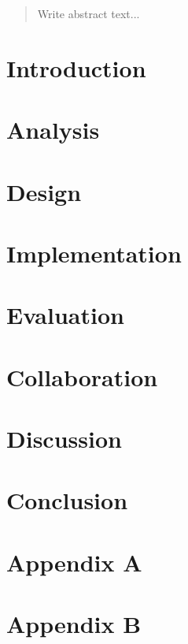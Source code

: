 \documentclass[12pt]{report} %
\begin{document}


\newpage %

\begin{abstract}
Write abstract text...
\end{abstract}

\newpage

\tableofcontents

\newpage

\chapter{Introduction}


\chapter{Analysis}


\chapter{Design}


\chapter{Implementation}


\chapter{Evaluation}


\chapter{Collaboration}


\chapter{Discussion}


\chapter{Conclusion}




\appendix
\label{appendix}

\chapter{Appendix A}


\chapter{Appendix B}
\label{app:appendixB}


\listoftodos
{}
\end{document}
